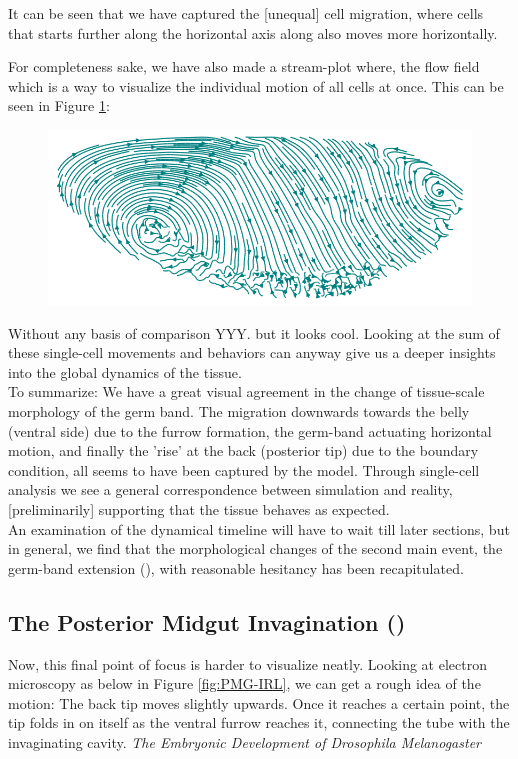 It can be seen that we have captured the [unequal] cell migration, where cells that starts further along the horizontal axis along also moves more horizontally. 

For completeness sake, we have also made a stream-plot where, the flow field which is a way to visualize the individual motion of all cells at once. This can be seen in Figure \ref{fig:streamplot}:


\begin{figure}[H]
    \centering
    \includegraphics[width=1\linewidth]{chapters/Results/figures/streamplot2.png}
    \caption{}
    \label{fig:streamplot}
\end{figure}

Without any basis of comparison YYY.  but it looks cool.
Looking at the sum of these single-cell movements and behaviors can anyway give us a deeper insights into the global dynamics of the tissue.\\

To summarize: We have a great visual agreement in the change of tissue-scale morphology of the germ band. The migration downwards towards the belly (ventral side) due to the furrow formation, the germ-band actuating horizontal motion, and finally the 'rise' at the back (posterior tip) due to the boundary condition, all seems to have been captured by the model. Through single-cell analysis we see a general correspondence between simulation and reality, [preliminarily] supporting that the tissue behaves as expected.\\  


An examination of the dynamical timeline will have to wait till later sections, but in general, we find that the morphological changes of the second main event, the germ-band extension (), with reasonable hesitancy has been recapitulated.


\subsection{The Posterior Midgut Invagination ()}
Now, this final point of focus is harder to visualize neatly. Looking at electron microscopy as below in Figure \ref{fig:PMG-IRL}, we can get a rough idea of the motion:
The back tip moves slightly upwards. Once it reaches a certain point, the tip folds in on itself as the ventral furrow reaches it, connecting the tube with the invaginating cavity. \textit{The Embryonic Development of Drosophila Melanogaster}

